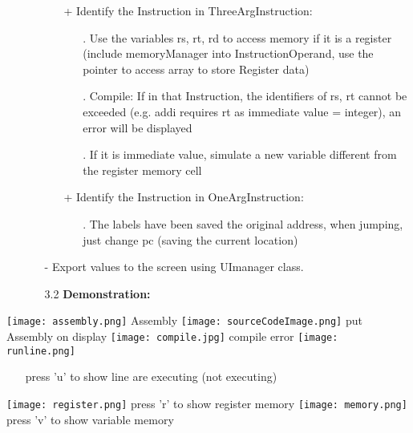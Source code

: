 \documentclass[10pt]{article}
\begin{document}
\begin{enumerate}
\begin{large}
\begin{enumerate}
\begin{enumerate}
\begin{enumerate}
\end{enumerate}
\item[+]Identify the Instruction in ThreeArgInstruction:
\begin{enumerate}
\item[.]Use the variables rs, rt, rd to access memory if it is a register (include memoryManager into InstructionOperand, use the pointer to access array to store Register data)
\item[.]Compile: If in that Instruction, the identifiers of rs, rt cannot be exceeded (e.g. addi requires rt as immediate value = integer), an error will be displayed
\item[.]If it is immediate value, simulate a new variable different from the register memory cell
\end{enumerate}
\item[+]Identify the Instruction in OneArgInstruction:
\begin{enumerate}
\item[.]The labels have been saved the original address, when jumping, just change pc (saving the current location)
\end{enumerate}
\end{enumerate}
\item[-]Export values to the screen using UImanager class.

\item[3.2]\textbf{Demonstration:}
\end{enumerate}
\end{large}
\end{enumerate}
\begin{center}
\texttt{[image: assembly.png]}
Assembly
\texttt{[image: sourceCodeImage.png]}
put Assembly on display
\texttt{[image: compile.jpg]}
compile error
\texttt{[image: runline.png]}
\begin{enumerate}
press 'n' to execute next line
\item[]press 'u' to show line are executing (not executing)
\end{enumerate}

\texttt{[image: register.png]}
press 'r' to show register memory
\texttt{[image: memory.png]}
press 'v' to show variable memory
\end{center}
\end{document}
